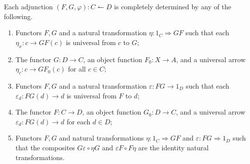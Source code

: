 \begin{theorem}\label{thm:4.2}
	Each adjunction $(F,G,\varphi ) : C \leftharpoonup D$ is completely determined by any of the following.
	\begin{enumerate}
		\item Functors $F,G$ and a natural transformation $\eta : 1_C \Rightarrow GF$ such that each $\eta _x : c \to GF(c)$ is universal from $c$ to $G$;
		\item The functor $G : D \to C$, an object function $F_0 : X \to A$, and a universal arrow $\eta_c : c \to GF_0(c)$ for all $c\in C$;
		\item Functors $F,G$ and a natural transformation $\varepsilon : FG \to 1_D$ such that each $\varepsilon _d : FG(d) \to d$ is universal from $F$ to $d$;
		\item The functor $F : C \to D$, an object function $G_0: D \to C$, and a universal arrow $\varepsilon _d : FG(d) \to d$ for each $d\in D$;
		\item Functors $F,G$ and natural transformations $\eta : 1_C \Rightarrow GF$ and $\varepsilon : FG \Rightarrow 1_D$ such that the composites $G\varepsilon \circ \eta G$ and $\varepsilon F\circ F\eta $ are the identity natural transformations.
	\end{enumerate}
\end{theorem}
